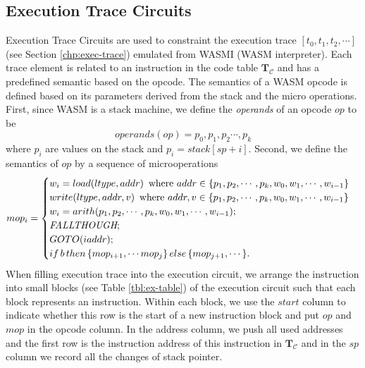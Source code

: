 \subsection{Execution Trace Circuits}
\label{chp:ex-table}
Execution Trace Circuits are used to constraint the execution trace $\left[t_0,t_1,t_2,\cdots\right]$ (see Section \ref{chp:exec-trace}) emulated from WASMI (WASM interpreter). Each trace element is related to an instruction in the code table $\mathbf{T}_\mathcal{C}$ and has a predefined semantic based on the opcode. The semantics of a WASM opcode is defined based on its parameters derived from the stack and the micro operations. First, since WASM is a stack machine, we define the \emph{operands} of an opcode $op$ to be
\[
operands(op) = p_0, p_1, p_2 \cdots, p_k
\]
where $p_i$ are values on the stack and $p_i = stack[sp+i]$.
Second, we define the semantics of $op$ by a sequence of microoperations
\[
mop_i = \begin{cases}
    w_i = load(ltype, addr)\, \textnormal{ where $addr \in \{p_1, p_2, \cdots, p_k, w_0, w_1, \cdots, w_{i-1}\}$}\\
    write(ltype, addr, v)\, \textnormal{ where $addr, v \in \{p_1, p_2, \cdots, p_k, w_0, w_1, \cdots, w_{i-1}\}$}\\
    w_i = arith(p_1, p_2,\cdots, p_k, w_0, w_1, \cdots, w_{i-1}); \\
    \textit{FALLTHOUGH}; \\
    GOTO(iaddr); \\
    if \, b\, then\, \{mop_{i+1}, \cdots mop_{j}\} \,else\, \{mop_{j+1},\cdots\}.
    \end{cases}
\]
When filling execution trace into the execution circuit, we arrange the instruction into small blocks (see Table \ref{tbl:ex-table}) of the execution circuit such that each block represents an instruction. Within each block, we use the $start$ column to indicate whether this row is the start of a new instruction block and put $op$ and $mop$ in the opcode column. In the address column, we push all used addresses and the first row is the instruction address of this instruction in $\mathbf{T}_\mathcal{C}$ and in the $sp$ column we record all the changes of stack pointer.
